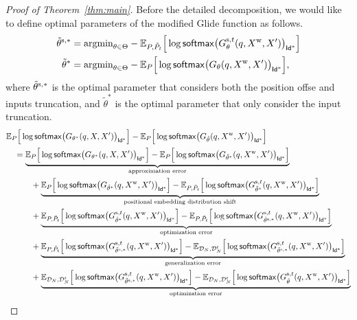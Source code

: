\begin{proof}[Proof of Theorem~\ref{thm:main}]
    Before the detailed decomposition, we would like to define optimal parameters of the modified Glide function as follows.
    \begin{align*}
        \tilde{\theta}^{\mathrm{s},*} &= \text{argmin}_{\theta\in\Theta} -\mathbb{E}_{P, \tilde{P}_{t}}\Big[\log \mathsf{softmax}\big( G_{\theta}^{\mathrm{s},t}(q,X^{\mathrm{w}},X^{\prime})\big)_{\mathsf{Id}^{*}}\Big] \nonumber\\
        \tilde{\theta}^{*} &=\text{argmin}_{\theta\in\Theta} -\mathbb{E}_{P}\Big[\log \mathsf{softmax}\big( G_{\theta}(q,X^{\mathrm{w}},X^{\prime})\big)_{\mathsf{Id}^{*}}\Big],
    \end{align*}
    where $\tilde{\theta}^{\mathrm{s},*}$ is the optimal parameter that considers both the position offse and inputs truncation, and $\tilde{\theta}^{*}$ is the optimal parameter that only consider the input truncation.
    \begin{align}
        &\bbE_{P}\Big[\log \sm\big( G_{\theta^{*}}(q,X,X^{\prime})\big)_{\id^{*}}\Big]- \bbE_{P}\Big[\log \sm\big( G_{\htheta}(q,X^{\rmw},X^{\prime})\big)_{\id^{*}}\Big]\nonumber\\
        &\quad = \underbrace{\bbE_{P}\Big[\log \sm\big( G_{\theta^{*}}(q,X,X^{\prime})\big)_{\id^{*}}\Big] - \bbE_{P}\Big[\log \sm\big( G_{\tilde{\theta}^{*}}(q,X^{\rmw},X^{\prime})\big)_{\id^{*}}\Big]}_{\text{approximation error}}\nonumber\\
        &\quad\qquad +  \underbrace{\bbE_{P}\Big[\log \sm\big( G_{\tilde{\theta}^{*}}(q,X^{\rmw},X^{\prime})\big)_{\id^{*}}\Big] -  \bbE_{P,\tilde{P}_{t}}\Big[\log \sm\big( G_{\tilde{\theta}^{*}}^{\rms, t}(q,X^{\rmw},X^{\prime})\big)_{\id^{*}}\Big]}_{\text{positional embedding distribution shift}}\nonumber\\
        &\quad\qquad + \underbrace{\bbE_{P,\tilde{P}_{t}}\Big[\log \sm\big( G_{\tilde{\theta}^{*}}^{\rms, t}(q,X^{\rmw},X^{\prime})\big)_{\id^{*}}\Big]-\bbE_{P,\tilde{P}_{t}}\Big[\log \sm\big( G_{\tilde{\theta}^{\rms,*}}^{\rms, t}(q,X^{\rmw},X^{\prime})\big)_{\id^{*}}\Big]}_{\text{optimization error}} \nonumber\\
        &\quad\qquad +\underbrace{\bbE_{P,\tilde{P}_{t}}\Big[\log \sm\big( G_{\tilde{\theta}^{\rms,*}}^{\rms, t}(q,X^{\rmw},X^{\prime})\big)_{\id^{*}}\Big] - \bbE_{\calD_N,\calD_{N}^{t}}\Big[\log \sm\big( G_{\tilde{\theta}^{\rms,*}}^{\rms,t}(q,X^{\rmw},X^{\prime})\big)_{\id^{*}}\Big]}_{\text{generalization error}} \nonumber\\
        &\quad\qquad + \underbrace{\bbE_{\calD_N,\calD_{N}^{t}}\Big[\log \sm\big( G_{\tilde{\theta}^{\rms,*}}^{\rms,t}(q,X^{\rmw},X^{\prime})\big)_{\id^{*}}\Big]- \bbE_{\calD_N,\calD_{N}^{t}}\Big[\log \sm\big( G_{\htheta}^{\rms,t}(q,X^{\rmw},X^{\prime})\big)_{\id^{*}}\Big]}_{\text{optimization error}}\nonumber\\

\end{align}
\end{proof}
